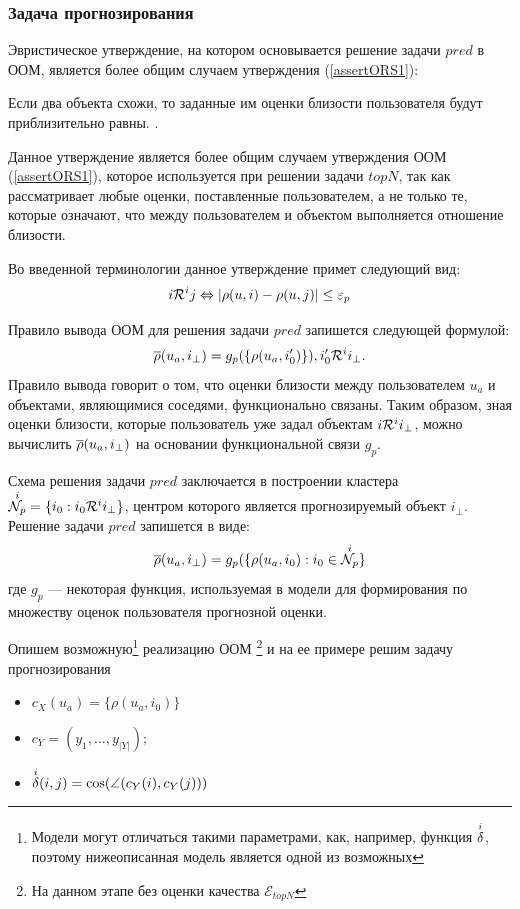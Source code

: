 
\subsubsection{Задача прогнозирования}
Эвристическое утверждение, на котором основывается решение задачи
$pred$ в ООМ, является более общим случаем утверждения
(\ref{assertORS1}):
\begin{assert}
	\label{assertORS2}
	Если два объекта схожи, то заданные им оценки близости пользователя будут
	приблизительно равны. \cite{rs-handbook,melville}.
\end{assert}
Данное утверждение является более общим случаем утверждения ООМ
(\ref{assertORS1}),
которое
используется при решении задачи $topN$,
так как рассматривает любые оценки, поставленные пользователем,
а не только те, которые означают, что между пользователем и объектом
выполняется отношение близости.

Во введенной терминологии данное утверждение примет следующий вид:
\begin{equation}
	i \mathcal{R}^i j \Leftrightarrow |\rho(u,i) - \rho(u,j)|
	\le \varepsilon_p
\end{equation}

Правило вывода ООМ для решения задачи $pred$ запишется следующей
формулой:
\begin{equation}
	\label{ors-pi-p}
	\overline{\rho}(u_a, i_{\bot}) = g_p(\{\rho(u_a, i^{\prime}_0)\}),
	i^{\prime}_0 \mathcal{R}^i i_{\bot}.
\end{equation}
Правило вывода говорит о том, что оценки близости между
пользователем $u_a$ и объектами, являющимися соседями,
функционально связаны. Таким образом, зная
оценки близости, которые пользователь уже задал объектам
$i \mathcal{R}^i i_{\bot}$, можно вычислить $\overline{\rho}(u_a, i_{\bot})$
на основании функциональной связи
$g_p$.

Схема решения задачи $pred$ заключается в построении кластера
${\overset{i}{\mathcal{N}_p}} = \{ i_0 : i_0 \mathcal{R}^i i_{\bot}\}$, центром которого является прогнозируемый
объект $i_{\bot}$. Решение задачи $pred$ запишется в виде:
\begin{equation}\label{pred-f}
	\overline{\rho}(u_a,i_{\bot}) = g_p(\{\rho(u_a, i_0): i_0 \in {\overset{i}{\mathcal{N}_p}} \}
\end{equation}
где $g_p$ --- некоторая функция, используемая в модели для
формирования по множеству оценок пользователя прогнозной оценки.

Опишем возможную\footnote{Модели могут отличаться такими параметрами, как,
например, функция ${\overset{i}{\mathcal{\delta}}}$, поэтому нижеописанная модель является одной из
возможных}
реализацию ООМ
\footnote{
	На данном этапе без оценки качества $\mathcal{E}_{topN}$
	}
 и на ее примере решим
задачу прогнозирования  \cite{item-based} %
\begin{itemize}
	\item $c_X(u_a) = \{\rho(u_a,i_0)\}$
	\item $c_Y = (y_1,...,y_{|Y|})$;
	\item ${\overset{i}{\mathcal{\delta}}}(i,j) = \cos(\angle(c_Y(i),c_Y(j)))$
\end{itemize}
\bigbreak

